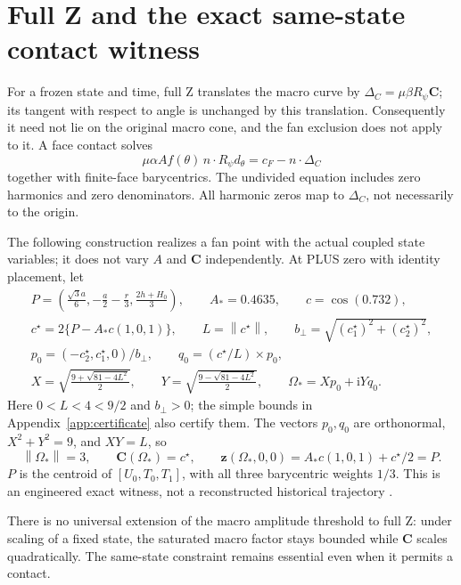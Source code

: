 \documentclass[11pt,a4paper]{article}
\numberwithin{equation}{section}
\newcommand{\ii}{\mathrm i}
\newcommand{\norm}[1]{\left\lVert#1\right\rVert}
\newcommand{\zobs}{\mathbf z}
\newcommand{\chiral}{\mathbf C}
\begin{document}
\section{Full Z and the exact same-state contact witness}\label{sec:full}
For a frozen state and time, full Z translates the macro curve by
$\Delta_C=\mu\beta R_\psi\chiral$; its tangent with respect to angle is
unchanged by this translation. Consequently it need not lie on the original
macro cone, and the fan exclusion does not apply to it. A face contact solves
\begin{equation}\label{eq:fullface}
\mu\alpha A f(\theta)\,n\cdot R_\psi d_\theta
=c_F-n\cdot\Delta_C
\end{equation}
together with finite-face barycentrics. The undivided equation includes
zero harmonics and zero denominators. All harmonic zeros map to
$\Delta_C$, not necessarily to the origin.

The following construction realizes a fan point with the actual coupled
state variables; it does not vary $A$ and $\chiral$ independently.
At PLUS zero with identity placement, let
\begin{equation}\label{eq:contactstate}
\begin{gathered}
P=\left(\frac{\sqrt3a}{6},-\frac a2-\frac r3,
\frac{2h+H_0}{3}\right),\qquad A_*=0.4635,\qquad c=\cos(0.732),\\
c^\star=2\{P-A_*c(1,0,1)\},\qquad L=\norm{c^\star},\qquad
b_\perp=\sqrt{(c^\star_1)^2+(c^\star_2)^2},\\
p_0=(-c^\star_2,c^\star_1,0)/b_\perp,\qquad
q_0=(c^\star/L)\times p_0,\\
X=\sqrt{\frac{9+\sqrt{81-4L^2}}2},\qquad
Y=\sqrt{\frac{9-\sqrt{81-4L^2}}2},\qquad
\Omega_*=Xp_0+\ii Yq_0 .
\end{gathered}
\end{equation}
Here $0<L<4<9/2$ and $b_\perp>0$; the simple bounds in
Appendix~\ref{app:certificate} also certify them. The vectors $p_0,q_0$
are orthonormal, $X^2+Y^2=9$, and $XY=L$, so
\[
\norm{\Omega_*}=3,\qquad \chiral(\Omega_*)=c^\star,\qquad
\zobs(\Omega_*,0,0)=A_*c(1,0,1)+c^\star/2=P.
\]
$P$ is the centroid of $[U_0,T_0,T_1]$, with all three barycentric
weights $1/3$. This is an engineered exact witness, not a reconstructed
historical trajectory \cite[R2, Section 7]{R2}.

There is no universal extension of the macro amplitude threshold to full Z:
under scaling of a fixed state, the saturated macro factor stays bounded
while $\chiral$ scales quadratically. The same-state constraint remains
essential even when it permits a contact.
\end{document}
